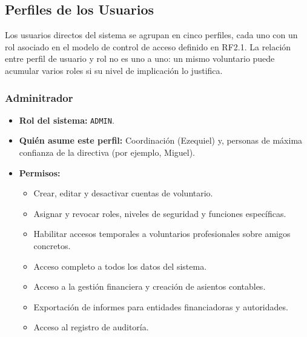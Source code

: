 \newpage

\subsection{Perfiles de los Usuarios}
Los usuarios directos del sistema se agrupan en cinco perfiles, cada uno con
un rol asociado en el modelo de control de acceso definido en RF2.1. La
relación entre perfil de usuario y rol no es uno a uno: un mismo voluntario
puede acumular varios roles si su nivel de implicación lo justifica.

\subsubsection{Adminitrador}
\begin{itemize}
    \item \textbf{Rol del sistema:} \texttt{ADMIN}.
    
    \item \textbf{Quién asume este perfil:} Coordinación (Ezequiel) y,
    personas de máxima confianza de la directiva (por ejemplo, Miguel).
    
    \item \textbf{Permisos:}
    \begin{itemize}
        \item Crear, editar y desactivar cuentas de voluntario.
        \item Asignar y revocar roles, niveles de seguridad y funciones específicas.
        \item Habilitar accesos temporales a voluntarios profesionales sobre amigos concretos.
        \item Acceso completo a todos los datos del sistema.
        \item Acceso a la gestión financiera y creación de asientos contables.
        \item Exportación de informes para entidades financiadoras y autoridades.
        \item Acceso al registro de auditoría.
    \end{itemize}
\end{itemize}



